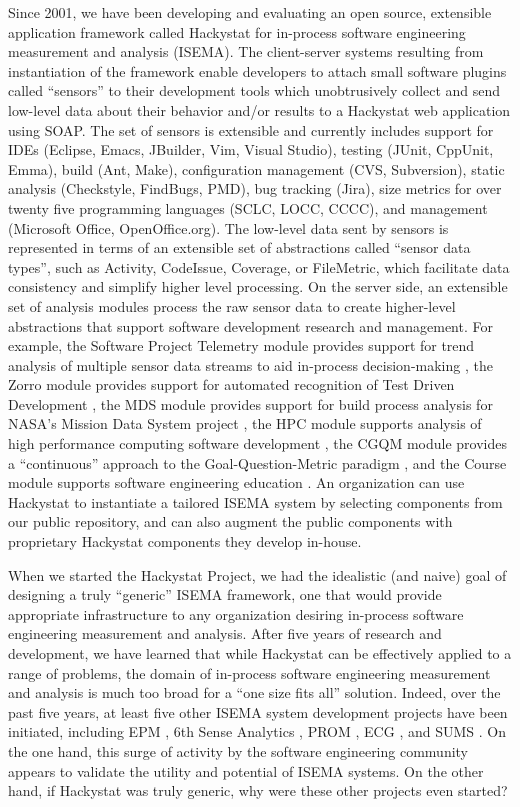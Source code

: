 \documentclass[10pt,twocolumn]{article}
\begin{document}
Since 2001, we have been developing and evaluating an open source,
extensible application framework called Hackystat for in-process software
engineering measurement and analysis (ISEMA).  The client-server systems
resulting from instantiation of the framework enable developers to attach
small software plugins called ``sensors'' to their development tools which
unobtrusively collect and send low-level data about their behavior and/or
results to a Hackystat web application using SOAP. The set of sensors is
extensible and currently includes support for IDEs (Eclipse, Emacs,
JBuilder, Vim, Visual Studio), testing (JUnit, CppUnit, Emma), build (Ant,
Make), configuration management (CVS, Subversion), static analysis
(Checkstyle, FindBugs, PMD), bug tracking (Jira), size metrics for over
twenty five programming languages (SCLC, LOCC, CCCC), and management
(Microsoft Office, OpenOffice.org). The low-level data sent by sensors is
represented in terms of an extensible set of abstractions called ``sensor
data types'', such as Activity, CodeIssue, Coverage, or FileMetric, which
facilitate data consistency and simplify higher level processing.  On the
server side, an extensible set of analysis modules process the raw sensor
data to create higher-level abstractions that support software development
research and management. For example, the Software Project Telemetry module
provides support for trend analysis of multiple sensor data streams to aid
in-process decision-making \cite{csdl2-04-11}, the Zorro module provides
support for automated recognition of Test Driven Development
\cite{csdl2-06-02}, the MDS module provides support for build process
analysis for NASA's Mission Data System project \cite{csdl2-03-07}, the HPC
module supports analysis of high performance computing software development
\cite{csdl2-04-22}, the CGQM module provides a ``continuous'' approach to
the Goal-Question-Metric paradigm \cite{csdl2-05-09}, and the Course module
supports software engineering education \cite{csdl2-03-12}.  An
organization can use Hackystat to instantiate a tailored ISEMA system by
selecting components from our public repository, and can also augment the
public components with proprietary Hackystat components they develop
in-house.

When we started the Hackystat Project, we had the idealistic (and naive)
goal of designing a truly ``generic'' ISEMA framework, one that would
provide appropriate infrastructure to any organization desiring in-process
software engineering measurement and analysis.  After five years of
research and development, we have learned that while Hackystat can be
effectively applied to a range of problems, the domain of in-process
software engineering measurement and analysis is much too broad for a ``one
size fits all'' solution.  Indeed, over the past five years, at least five
other ISEMA system development projects have been initiated, including EPM
\cite{EPM}, 6th Sense Analytics \cite{SixthSenseAnalytics}, PROM
\cite{PROM}, ECG \cite{ECG}, and SUMS \cite{SUMS}. On the one hand, this
surge of activity by the software engineering community appears to validate
the utility and potential of ISEMA systems.  On the other hand, if
Hackystat was truly generic, why were these other projects even started?
\end{document}
